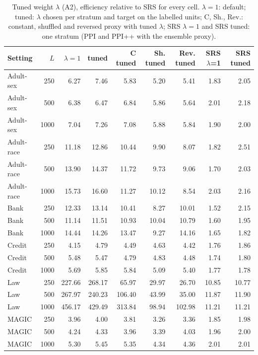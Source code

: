 \documentclass[pdflatex,sn-mathphys-num,iicol]{sn-jnl}
\theoremstyle{thmstyleone}
\theoremstyle{thmstyletwo}
\theoremstyle{thmstylethree}
\begin{document}
\begin{table}[t]
\centering\scriptsize
\caption{Tuned weight $\lambda$ (A2), efficiency relative to SRS for every cell. $\lambda=1$: default; tuned: $\lambda$ chosen per stratum and target on the labelled units; C, Sh., Rev.: constant, shuffled and reversed proxy with tuned $\lambda$; SRS $\lambda{=}1$ and SRS tuned: one stratum (PPI and PPI++ with the ensemble proxy).}
\label{tab:abl-app-eff-tuned}
\setlength{\tabcolsep}{4pt}
\begin{tabular}{lrrrrrrrr}
\toprule
Setting & $L$ & $\lambda=1$ & tuned & C tuned & Sh. tuned & Rev. tuned & SRS $\lambda$=1 & SRS tuned \\
\midrule
Adult-sex & 250 & 6.27 & 7.46 & 5.83 & 5.20 & 5.41 & 1.83 & 2.05 \\
Adult-sex & 500 & 6.38 & 6.47 & 6.84 & 5.86 & 5.64 & 2.01 & 2.18 \\
Adult-sex & 1000 & 7.04 & 7.26 & 7.08 & 5.88 & 5.84 & 1.90 & 2.00 \\
Adult-race & 250 & 11.18 & 12.86 & 10.44 & 9.90 & 8.07 & 1.82 & 2.51 \\
Adult-race & 500 & 13.90 & 14.37 & 11.72 & 9.73 & 9.06 & 1.70 & 2.03 \\
Adult-race & 1000 & 15.73 & 16.60 & 11.27 & 10.12 & 8.54 & 2.03 & 2.16 \\
Bank & 250 & 12.33 & 13.14 & 10.41 & 8.27 & 10.01 & 1.52 & 2.15 \\
Bank & 500 & 11.14 & 11.51 & 10.93 & 10.04 & 10.79 & 1.60 & 1.95 \\
Bank & 1000 & 14.44 & 14.26 & 13.47 & 9.27 & 14.16 & 1.65 & 1.82 \\
Credit & 250 & 4.15 & 4.79 & 4.49 & 4.63 & 4.42 & 1.76 & 1.86 \\
Credit & 500 & 5.48 & 5.47 & 4.79 & 4.83 & 4.48 & 1.74 & 1.80 \\
Credit & 1000 & 5.69 & 5.85 & 5.84 & 5.09 & 5.40 & 1.77 & 1.78 \\
Law & 250 & 227.66 & 268.17 & 65.97 & 29.97 & 26.70 & 10.85 & 10.77 \\
Law & 500 & 267.97 & 240.23 & 106.40 & 43.99 & 35.00 & 11.87 & 11.90 \\
Law & 1000 & 456.17 & 429.49 & 313.84 & 98.94 & 102.98 & 11.21 & 11.21 \\
MAGIC & 250 & 3.96 & 4.00 & 3.81 & 3.26 & 3.36 & 1.85 & 1.98 \\
MAGIC & 500 & 4.24 & 4.33 & 3.96 & 3.39 & 4.03 & 1.96 & 2.00 \\
MAGIC & 1000 & 5.30 & 5.45 & 5.35 & 4.34 & 4.36 & 2.01 & 2.01 \\

\end{tabular}
\end{table}
\end{document}
